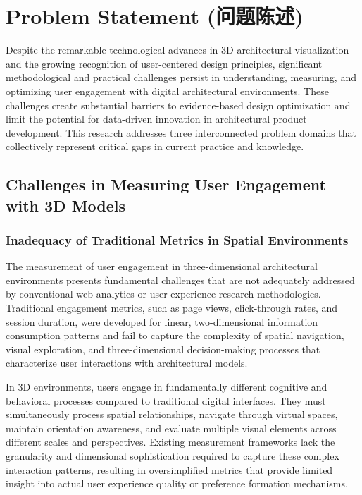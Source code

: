 \documentclass[12pt,a4paper]{book}
\begin{document}
\section{Problem Statement (问题陈述)}
\label{sec:problem_statement}

Despite the remarkable technological advances in 3D architectural visualization and the growing recognition of user-centered design principles, significant methodological and practical challenges persist in understanding, measuring, and optimizing user engagement with digital architectural environments. These challenges create substantial barriers to evidence-based design optimization and limit the potential for data-driven innovation in architectural product development. This research addresses three interconnected problem domains that collectively represent critical gaps in current practice and knowledge.

\subsection{Challenges in Measuring User Engagement with 3D Models}
\label{subsec:measuring_engagement_challenges}

\subsubsection{Inadequacy of Traditional Metrics in Spatial Environments}
\label{subsubsec:traditional_metrics_inadequacy}

The measurement of user engagement in three-dimensional architectural environments presents fundamental challenges that are not adequately addressed by conventional web analytics or user experience research methodologies. Traditional engagement metrics, such as page views, click-through rates, and session duration, were developed for linear, two-dimensional information consumption patterns and fail to capture the complexity of spatial navigation, visual exploration, and three-dimensional decision-making processes that characterize user interactions with architectural models.

In 3D environments, users engage in fundamentally different cognitive and behavioral processes compared to traditional digital interfaces. They must simultaneously process spatial relationships, navigate through virtual spaces, maintain orientation awareness, and evaluate multiple visual elements across different scales and perspectives. Existing measurement frameworks lack the granularity and dimensional sophistication required to capture these complex interaction patterns, resulting in oversimplified metrics that provide limited insight into actual user experience quality or preference formation mechanisms.
\end{document}
